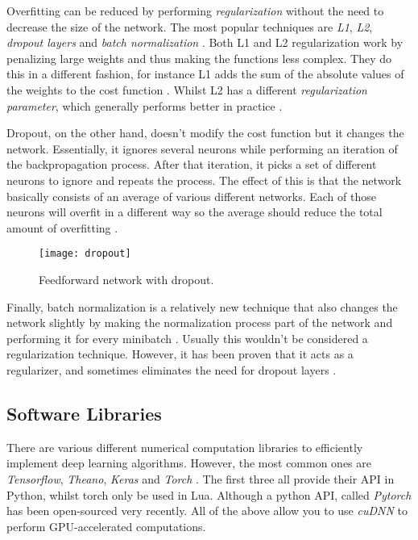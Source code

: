 Overfitting can be reduced by performing \textit{regularization} without the need to decrease the size of the network.
The most popular techniques are \textit{L1}, \textit{L2}, \textit{dropout layers} and \textit{batch normalization} \cite{nielsen_2017}.
Both L1 and L2 regularization work by penalizing large weights and thus making the functions less complex.
They do this in a different fashion, for instance L1 adds the sum of the absolute values of the weights to the cost function \cite{nielsen_2017}.
Whilst L2 has a different \textit{regularization parameter}, which generally performs better in practice \cite{nielsen_2017}.

Dropout, on the other hand, doesn't modify the cost function but it changes the network.
Essentially, it ignores several neurons while performing an iteration of the backpropagation process.
After that iteration, it picks a set of different neurons to ignore and repeats the process.
The effect of this is that the network basically consists of an average of various different networks.
Each of those neurons will overfit in a different way so the average should reduce the total amount of overfitting \cite{nielsen_2017}.

\begin{figure}[ht]
  \centering
  \texttt{[image: dropout]}
  \caption{Feedforward network with dropout.}
  \label{fig:overfit}
\end{figure}


Finally, batch normalization is a relatively new technique that also changes the network slightly by making the normalization process part of the network and performing it for every minibatch \cite{ioffe2015batch}.
Usually this wouldn't be considered a regularization technique.
However, it has been proven that it acts as a regularizer, and sometimes eliminates the need for dropout layers \cite{ioffe2015batch}.


\subsection{Software Libraries}

There are various different numerical computation libraries to efficiently implement deep learning algorithms.
However, the most common ones are \textit{Tensorflow}, \textit{Theano}, \textit{Keras} and \textit{Torch} \cite{tensorflow,theano,keras,torch}.
The first three all provide their API in Python, whilst torch only be used in Lua.
Although a python API, called \textit{Pytorch} has been open-sourced very recently.
All of the above allow you to use \textit{cuDNN} to perform GPU-accelerated computations.

